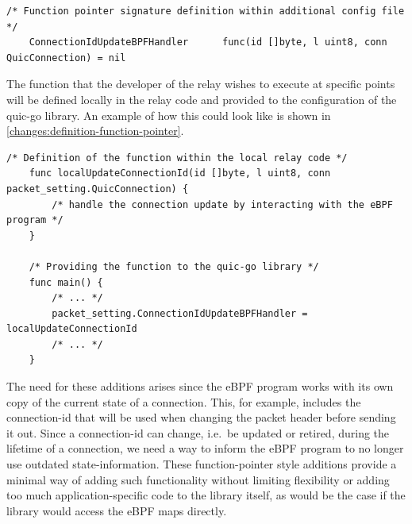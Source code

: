 \vspace{0.5cm}
\noindent\begin{minipage}{\textwidth}
\begin{lstlisting}[style=GoStyle, label=changes:signature-function-pointer, caption=Only the signature will be defined within the library itself.]
    /* Function pointer signature definition within additional config file */
	ConnectionIdUpdateBPFHandler      func(id []byte, l uint8, conn QuicConnection) = nil
\end{lstlisting}
\end{minipage}

The function that the developer of the relay wishes to execute at specific points will be defined 
locally in the relay code and provided to the configuration of the quic-go library.
An example of how this could look like is shown in \autoref{changes:definition-function-pointer}.

\vspace{0.5cm}
\noindent\begin{minipage}{\textwidth}
\begin{lstlisting}[style=GoStyle, label=changes:definition-function-pointer, caption=An example of how the addition looks on the relay side.]
    /* Definition of the function within the local relay code */
    func localUpdateConnectionId(id []byte, l uint8, conn packet_setting.QuicConnection) {
        /* handle the connection update by interacting with the eBPF program */
    }   

    /* Providing the function to the quic-go library */
    func main() {
        /* ... */
        packet_setting.ConnectionIdUpdateBPFHandler = localUpdateConnectionId
        /* ... */
    }
\end{lstlisting}
\end{minipage}

The need for these additions arises since the eBPF program works with its own copy of the current state of a connection.
This, for example, includes the connection-id that will be used when changing the packet header before sending it out.
Since a connection-id can change, i.e.~be updated or retired, during the lifetime of a connection, we need a way to inform 
the eBPF program to no longer use outdated state-information.
These function-pointer style additions provide a minimal way of adding such functionality without limiting flexibility 
or adding too much application-specific code to the library itself, as would be the case if the library would access 
the eBPF maps directly.

